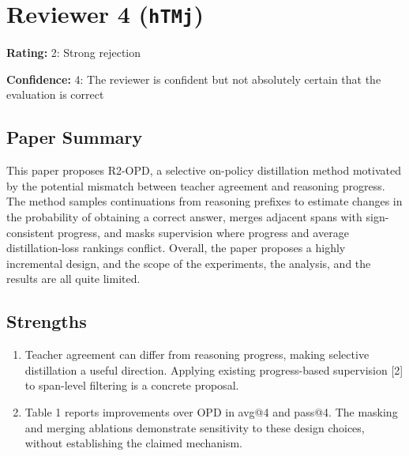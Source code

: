 \documentclass[11pt,a4paper]{article}
\begin{document}
\clearpage

\section{Reviewer 4 (\texttt{hTMj})}
\label{reviewer:4}
\noindent\textbf{Rating:} 2: Strong rejection\par
\noindent\textbf{Confidence:} 4: The reviewer is confident but not absolutely certain that the evaluation is correct

\subsection*{Paper Summary}
This paper proposes R2-OPD, a selective on-policy distillation method motivated by the potential mismatch between teacher agreement and reasoning progress. The method samples continuations from reasoning prefixes to estimate changes in the probability of obtaining a correct answer, merges adjacent spans with sign-consistent progress, and masks supervision where progress and average distillation-loss rankings conflict. Overall, the paper proposes a highly incremental design, and the scope of the experiments, the analysis, and the results are all quite limited.

\subsection*{Strengths}
\begin{enumerate}
\item Teacher agreement can differ from reasoning progress, making selective distillation a useful direction. Applying existing progress-based supervision [2] to span-level filtering is a concrete proposal.
\item Table 1 reports improvements over OPD in avg@4 and pass@4. The masking and merging ablations demonstrate sensitivity to these design choices, without establishing the claimed mechanism.
\end{enumerate}
\end{document}
